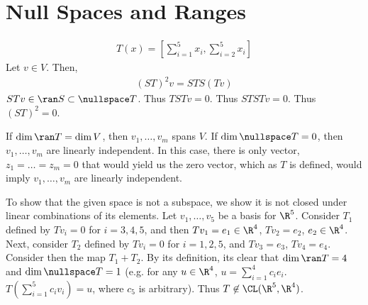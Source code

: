 \documentclass{book}
\begin{document}
\section{Null Spaces and Ranges}
  \begin{enumerate}[label=\arabic*)]
    \ii 
      \begin{align*}
        T(x) = [\sum_{i = 1}^{5}x_i, \sum_{i = 2}^{5}x_i]
      \end{align*}
    \ii
      Let $v \in V$. Then,
      \begin{align*}
        (ST)^2v = STS(Tv)
      \end{align*}
      $STv \in \ran S \subset \nullspace T$. Thus $TSTv = 0$. Thus $STSTv = 0$. Thus $(ST)^2 = 0$.
    \ii
      \begin{enumerate}[label=\alph*)]
        \ii 
          If $\dim\ran T = \dim V$, then $v_1, \dots, v_m$ spans $V$.
        \ii
          If $\dim\nullspace T = 0$, then $v_1, \dots, v_m$ are linearly independent. In this case, there is only vector, $z_1 = \dots = z_m = 0$ that would yield us the zero vector, which as
          $T$ is defined, would imply $v_1, \dots, v_m$ are linearly independent.
      \end{enumerate}
    \ii
      To show that the given space is not a subspace, we show it is not closed under linear combinations of its elements. Let $v_1, \dots, v_5$ be a basis for $\R^5$. Consider $T_1$ defined
      by $Tv_i = 0$ for $i = 3, 4, 5$, and then $Tv_1 = e_1 \in \R^4$, $Tv_2 = e_2$, $e_2 \in \R^4$. Next, consider $T_2$ defined by $Tv_i = 0$ for $i = 1, 2, 5$, and $Tv_3 = e_3$, $Tv_4 =
      e_4$. Consider then the map $T_1 + T_2$. By its definition, its clear that $\dim\ran T = 4$ and $\dim\nullspace T = 1$ (e.g. for any $u \in \R^4$, $u = \sum_{i = 1}^{4}c_ie_i$.
      $T(\sum_{i = 1}^{5}c_iv_i) = u$, where $c_5$ is arbitrary). Thus $T \not\in \CL(\R^5, \R^4)$.


\end{enumerate}
\end{document}
